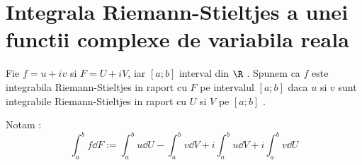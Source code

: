 \section{Integrala Riemann-Stieltjes a unei functii complexe de variabila reala}

\begin{definition}
    Fie $f=u+iv$ si $F=U+iV$, iar $[a;b]$ interval din $\R$ . Spunem ca $f$ este integrabila
    Riemann-Stieltjes in raport cu $F$ pe intervalul $[a;b]$ daca $u$ si $v$ sunt integrabile
    Riemann-Stieltjes in raport cu $U$ si $V$ pe $[a;b]$ .

    Notam :
    \begin{equation*}
        \int_a^b f \dd F := \int_a^b u \dd U - \int_a^b v \dd V + i\int_a^b u \dd V + i\int_a^b v \dd U
    \end{equation*}
\end{definition}

